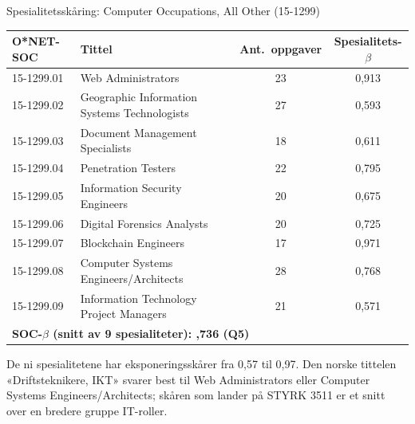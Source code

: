 \begin{frame}{Spesialitetsskåring: Computer Occupations, All Other (15-1299)}
\centering\small
\setlength{\tabcolsep}{6pt}
\renewcommand{\arraystretch}{1.05}
\begin{tabular}{lp{5.5cm}cc}
\toprule
O*NET-SOC & Tittel & Ant.\ oppgaver & Spesialitets-$\beta$ \\
\midrule
15-1299.01 & Web Administrators                            & 23 & 0,913 \\
15-1299.02 & Geographic Information Systems Technologists  & 27 & 0,593 \\
15-1299.03 & Document Management Specialists               & 18 & 0,611 \\
15-1299.04 & Penetration Testers                           & 22 & 0,795 \\
15-1299.05 & Information Security Engineers                & 20 & 0,675 \\
15-1299.06 & Digital Forensics Analysts                    & 20 & 0,725 \\
15-1299.07 & Blockchain Engineers                          & 17 & 0,971 \\
15-1299.08 & Computer Systems Engineers/Architects         & 28 & 0,768 \\
15-1299.09 & Information Technology Project Managers       & 21 & 0,571 \\
\midrule
\multicolumn{4}{l}{\textbf{SOC-$\beta$ (snitt av 9 spesialiteter): \;0,736 (Q5)}} \\
\bottomrule
\end{tabular}

\vspace{0.7em}
\footnotesize
De ni spesialitetene har eksponeringsskårer fra 0,57 til 0,97. Den norske tittelen «Driftsteknikere, IKT» svarer best til Web Administrators eller Computer Systems Engineers/Architects; skåren som lander på STYRK 3511 er et snitt over en bredere gruppe IT-roller.
\end{frame}

